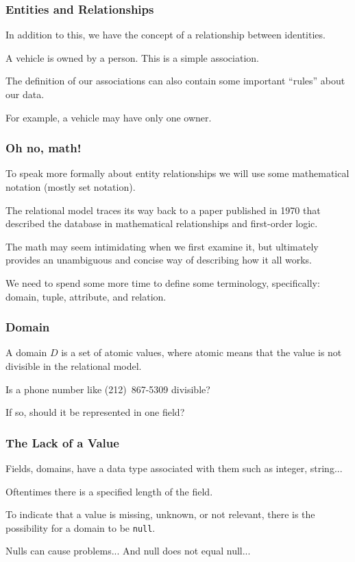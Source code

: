 \begin{frame}
\frametitle{Entities and Relationships}

In addition to this, we have the concept of a relationship between identities. 

A vehicle is owned by a person. This is a simple association. 

The definition of our associations can also contain some important ``rules'' about our data. 

For example, a vehicle may have only one owner.


\end{frame}



\begin{frame}
\frametitle{Oh no, math!}

To speak more formally about entity relationships we will use some mathematical notation (mostly set notation). 

The relational model traces its way back to a paper published in 1970 that described the database in mathematical relationships and first-order logic. 

The math may seem intimidating when we first examine it, but ultimately provides an unambiguous and concise way of describing how it all works.

We need to spend some more time to define some terminology, specifically: domain, tuple, attribute, and relation.  

\end{frame}



\begin{frame}
\frametitle{Domain}

A \alert{domain} $D$ is a set of atomic values, where atomic means that the value is not divisible in the relational model. 

Is a phone number like {(212)~867-5309} divisible?

If so, should it be represented in one field? 

\end{frame}



\begin{frame}
\frametitle{The Lack of a Value}

Fields, domains, have a data type associated with them such as integer, string... 

Oftentimes there is a specified length of the field.

To indicate that a value is missing, unknown, or not relevant, there is the possibility for a domain to be \texttt{null}.

Nulls can cause problems... And null does not equal null...

\end{frame}



